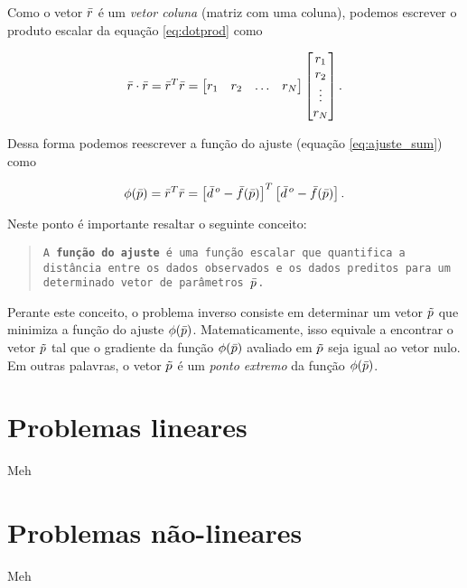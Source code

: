 \noindent Como o vetor $\bar{r}$ é um {\it vetor coluna} (matriz com uma
coluna), podemos escrever o produto escalar da equação \ref{eq:dotprod} como

\begin{equation}
\bar{r} \cdot \bar{r} = \bar{r}^T \bar{r} =
    \begin{bmatrix}
        r_1 & r_2 & \hdots & r_N
    \end{bmatrix}
    \begin{bmatrix}
        r_1 \\ r_2 \\ \vdots \\ r_N
    \end{bmatrix} .
\label{eq:vectdotprod}
\end{equation}

\noindent Dessa forma podemos reescrever a função do ajuste (equação
\ref{eq:ajuste_sum}) como

\begin{equation}
\phi(\bar{p}) = \bar{r}^T \bar{r} =
    \left[\bar{d}^{\thinspace o} - \bar{f}(\bar{p})\right]^T
    \left[\bar{d}^{\thinspace o} - \bar{f}(\bar{p})\right] .
\label{eq:ajuste}
\end{equation}

\indent Neste ponto é importante resaltar o seguinte conceito:

\begin{quotation}
{\tt A {\bf função do ajuste} é uma função escalar que
quantifica a dis\-tân\-cia entre os dados observados e os dados preditos para um
de\-ter\-mi\-na\-do vetor de parâmetros $\bar{p}$.}
\end{quotation}

\indent Perante este conceito, o problema inverso consiste em determinar um
vetor $\tilde{p}$ que minimiza a função do ajuste $\phi(\bar{p})$. 
Matematicamente, isso equivale a encontrar o vetor $\tilde{p}$ tal que o gradiente
da função $\phi(\bar{p})$ avaliado em $\tilde{p}$ seja igual ao vetor nulo.
Em outras palavras, o vetor $\tilde{p}$ é um {\it ponto extremo} da função
$\phi(\bar{p})$.


\section{Problemas lineares}

Meh

\section{Problemas não-lineares}

Meh

